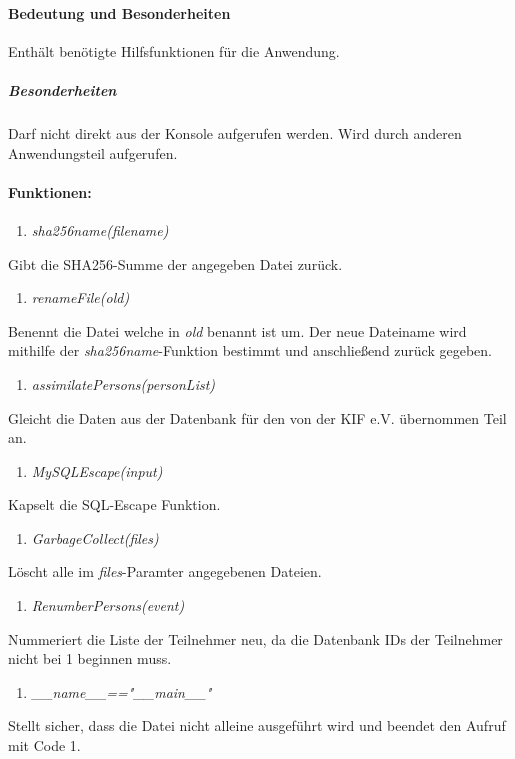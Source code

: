 \documentclass[12pt,parskip=full, pagea4]{scrreprt}
\begin{document}
			\paragraph{Bedeutung und Besonderheiten}Enth\"alt ben\"otigte Hilfsfunktionen für die Anwendung.
			\subparagraph{Besonderheiten}Darf nicht direkt aus der Konsole aufgerufen werden. Wird durch anderen Anwendungsteil aufgerufen.
			\paragraph{Funktionen:}
			\begin{enumerate}
				\item \textit{sha256name(filename)}
			\end{enumerate}
			\leftskip=1.5cm	Gibt die SHA256-Summe der angegeben Datei zur\"uck.
			\begin{enumerate}[resume]
				\item \textit{renameFile(old)}
			\end{enumerate}
			\leftskip=1.5cm Benennt die Datei welche in \textit{old} benannt ist um. Der neue Dateiname wird mithilfe der \textit{sha256name}-Funktion bestimmt und anschließend zur\"uck gegeben.
			\begin{enumerate}[resume]
				\item \textit{assimilatePersons(personList)}
			\end{enumerate}
			\leftskip=1.5cm	Gleicht die Daten aus der Datenbank f\"ur den von der KIF e.V. \"ubernommen Teil an.
			\begin{enumerate}[resume]
				\item \textit{MySQLEscape(input)}
			\end{enumerate}
			\leftskip=1.5cm	Kapselt die SQL-Escape Funktion.
			\begin{enumerate}[resume]
				\item \textit{GarbageCollect(files)}
			\end{enumerate}
			\leftskip=1.5cm	L\"oscht alle im \textit{files}-Paramter angegebenen Dateien.
			\begin{enumerate}[resume]
				\item \textit{RenumberPersons(event)}
			\end{enumerate}
			\leftskip=1.5cm	Nummeriert die Liste der Teilnehmer neu, da die Datenbank IDs der Teilnehmer nicht bei 1 beginnen muss.
			\begin{enumerate}[resume]
				\item \textit{\_\_name\_\_=="\_\_main\_\_"}	
			\end{enumerate}
			\leftskip=1.5cm	Stellt sicher, dass die Datei nicht alleine ausgeführt wird und beendet den Aufruf mit Code 1.
			
\end{document}
